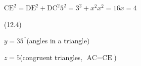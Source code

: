 {\begin{mdframed}[linewidth=4, leftmargin=40, rightmargin=40]
\begin{exercise}
\begin{enumerate}[noitemsep, label=\textbf{Step} \textbf{\arabic*}. ]
{\begin{equation}
      \end{equation}
    }{%
    \setlength{\mymathboxwidth}{\columnwidth}
      \addtolength{\mymathboxwidth}{-48pt}
    \par\vspace{12pt}\noindent\begin{minipage}{\columnwidth}
    \parbox[t]{\mymathboxwidth}{\large$
    {\text{CE}}^{2}={\text{DE}}^{2}+{\text{DC}}^{2}{5}^{2}={3}^{2}+{x}^{2}{x}^{2}=16x=4$}\hfill
    \parbox[t]{48pt}{\raggedleft 
    (12.4)}
    \end{minipage}\vspace{12pt}\par
    }%
      \par 
      \label{m39368*id1166229837179}$y={35}^{\ensuremath{{\,}^{\circ}}}$\hspace{1ex}(angles in a triangle)\par 
      \label{m39368*id1166228117285}$z=5$\hspace{1ex}(congruent triangles, 
$\text{AC}=\text{CE}$)\par \end{enumerate}
    \end{exercise}
    \end{mdframed}
    }
    \noindent
  \label{m39368*secfhsst!!!underscore!!!id824}
